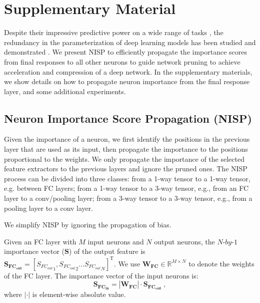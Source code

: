\documentclass[10pt,twocolumn,letterpaper]{article}
\begin{document}
\section{Supplementary Material}

Despite their impressive predictive power on a wide range of tasks \cite{faster, xu1,xu3,yu1,yu2,peng,yu3,yu6,yu7,xu2,yu4,yu5}, the redundancy in the parameterization of deep learning models has been studied and demonstrated \cite{PredictingParameters}. We present NISP to efficiently propagate the importance scores from final responses to all other neurons to guide network pruning to achieve acceleration and compression of a deep network.
In the supplementary materials, we show details on how to propagate neuron importance from the final response layer, and some additional experiments.

\subsection{Neuron Importance Score Propagation (NISP)}
Given the importance of a neuron, we first identify the positions in the previous layer that are used as its input, then propagate the importance to the positions proportional to the weights. 
We only propagate the importance of the selected feature extractors to the previous layers and ignore the pruned ones.
The NISP process can be divided into three classes: from a 1-way tensor to a 1-way tensor, e.g. between FC layers; from a 1-way tensor to a 3-way tensor, e.g., from an FC layer to a conv/pooling layer; from a 3-way tensor to a 3-way tensor, e.g., from a pooling layer to a conv layer.

We simplify NISP by ignoring the propagation of bias.

Given an FC layer with $M$ input neurons and $N$ output neurons, the $N
\text{-}by\text{-}1$ importance vector ($\mathbf{S}$) of the output feature is $\mathbf{S_{FC_{out}}}=\left [{S_{FC_{out}}}_1,{S_{FC_{out}}}_2 \dots {S_{FC_{out}}}_N\right ]^\text{T}$. 
We use $\mathbf{W_{FC}}\in \mathbb{R}^{M\times N}$ to denote the weights of the FC layer. The importance vector of the input neurons is:
\begin{equation}
\label{RI_FC_FC}
\mathbf{S_{FC_{in}}}=|\mathbf{W_{FC}}|  \cdot  \mathbf{S_{FC_{out}}}~,
\end{equation}
where $|\cdot|$ is element-wise absolute value.
\end{document}
